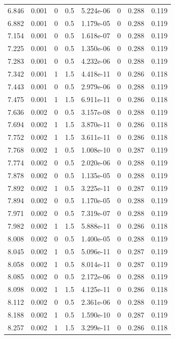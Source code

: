 \documentclass[preview]{standalone}
\begin{document}
{{{\begin{tabular}{L{1.2cm}C{1.2cm} C{0.3cm}C{0.5cm} C{1.4cm}C{1.4cm} C{1.4cm}C{1.4cm}}
  6.846  &  0.001  & 0     & 0.5 &  5.224e-06  & 0  & 0.288 &  0.119   \\ 
  6.882  &  0.001  & 0     & 0.5 &  1.179e-05  & 0  & 0.288 &  0.119   \\ 
  7.154  &  0.001  & 0     & 0.5 &  1.618e-07  & 0  & 0.288 &  0.119   \\ 
  7.225  &  0.001  & 0     & 0.5 &  1.350e-06  & 0  & 0.288 &  0.119   \\ 
  7.283  &  0.001  & 0     & 0.5 &  4.232e-06  & 0  & 0.288 &  0.119   \\ 
  7.342  &  0.001  & 1     & 1.5 &  4.418e-11  & 0  & 0.286 &  0.118   \\ 
  7.443  &  0.001  & 0     & 0.5 &  2.979e-06  & 0  & 0.288 &  0.119   \\ 
  7.475  &  0.001  & 1     & 1.5 &  6.911e-11  & 0  & 0.286 &  0.118   \\ 
  7.636  &  0.002  & 0     & 0.5 &  3.157e-08  & 0  & 0.288 &  0.119   \\ 
  7.694  &  0.002  & 1     & 1.5 &  3.870e-11  & 0  & 0.286 &  0.118   \\ 
  7.752  &  0.002  & 1     & 1.5 &  3.611e-11  & 0  & 0.286 &  0.118   \\ 
  7.768  &  0.002  & 1     & 0.5 &  1.008e-10  & 0  & 0.287 &  0.119   \\ 
  7.774  &  0.002  & 0     & 0.5 &  2.020e-06  & 0  & 0.288 &  0.119   \\ 
  7.878  &  0.002  & 0     & 0.5 &  1.135e-05  & 0  & 0.288 &  0.119   \\ 
  7.892  &  0.002  & 1     & 0.5 &  3.225e-11  & 0  & 0.287 &  0.119   \\ 
  7.894  &  0.002  & 0     & 0.5 &  1.170e-05  & 0  & 0.288 &  0.119   \\ 
  7.971  &  0.002  & 0     & 0.5 &  7.319e-07  & 0  & 0.288 &  0.119   \\ 
  7.982  &  0.002  & 1     & 1.5 &  5.888e-11  & 0  & 0.286 &  0.118   \\ 
  8.008  &  0.002  & 0     & 0.5 &  1.400e-05  & 0  & 0.288 &  0.119   \\ 
  8.045  &  0.002  & 1     & 0.5 &  5.096e-11  & 0  & 0.287 &  0.119   \\ 
  8.058  &  0.002  & 1     & 0.5 &  8.014e-11  & 0  & 0.287 &  0.119   \\ 
  8.085  &  0.002  & 0     & 0.5 &  2.172e-06  & 0  & 0.288 &  0.119   \\ 
  8.098  &  0.002  & 1     & 1.5 &  4.125e-11  & 0  & 0.286 &  0.118   \\ 
  8.112  &  0.002  & 0     & 0.5 &  2.361e-06  & 0  & 0.288 &  0.119   \\ 
  8.188  &  0.002  & 1     & 0.5 &  1.590e-10  & 0  & 0.287 &  0.119   \\ 
  8.257  &  0.002  & 1     & 1.5 &  3.299e-11  & 0  & 0.286 &  0.118   \\ 
\hline 
\end{tabular} 

}}}
\end{document}
